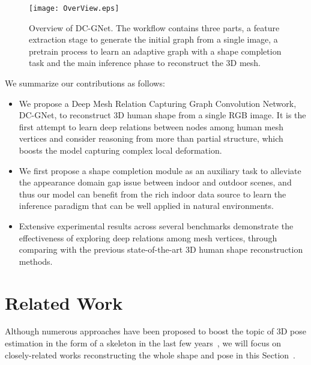 \documentclass[sigplan]{acmart}
\begin{document}
\begin{figure*}[]
\centering
\texttt{[image: OverView.eps]}
\caption{Overview of DC-GNet. The workflow contains three parts, a feature extraction stage to generate the initial graph from a single image, a pretrain process to learn an adaptive graph with a shape completion task and the main inference phase to reconstruct the 3D mesh.  }
\label{pic:overview}
\end{figure*}
We summarize our contributions as follows:
\begin{itemize}
\item[] We propose a Deep Mesh Relation Capturing Graph Convolution Network, DC-GNet, to reconstruct 3D human shape from a single RGB image. It is the first attempt to learn deep relations between nodes among human mesh vertices and consider reasoning from more than partial structure, which boosts the model capturing complex local deformation.

\item[] We first propose a shape completion module as an auxiliary task to alleviate the appearance domain gap issue between indoor and outdoor scenes, and thus our model can benefit from the rich indoor data source to learn the inference paradigm that can be well applied in natural environments.
\item[] Extensive experimental results across several benchmarks demonstrate the effectiveness of exploring deep relations among mesh vertices, through comparing with the previous state-of-the-art 3D human shape reconstruction methods.
\end{itemize}


\section{Related Work}
Although numerous approaches have been proposed to boost the topic of 3D pose estimation in the form of a skeleton in the last few years~\cite{20163D,7298976,BMVC.28.80,Zhou2019MonoCap,Suman2013A,towards3D_shhzhou}, we will focus on closely-related works reconstructing the whole shape and pose in this Section~\cite{Guler_2019_CVPR,Sun_2019_ICCV,kolotouros2019spin}.
\end{document}
